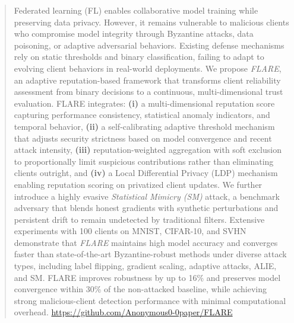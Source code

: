 \documentclass[lettersize,journal]{IEEEtran}
\begin{document}
\begin{abstract}
Federated learning (FL) enables collaborative model training while preserving data privacy. However, it remains vulnerable to malicious clients who compromise model integrity through Byzantine attacks, data poisoning, or adaptive adversarial behaviors. Existing defense mechanisms rely on static thresholds and binary classification, failing to adapt to evolving client behaviors in real-world deployments. We propose \textit{FLARE}, an adaptive reputation-based framework that transforms client reliability assessment from binary decisions to a continuous, multi-dimensional trust evaluation. 
FLARE integrates: \textbf{(i)} a multi-dimensional reputation score capturing performance consistency, statistical anomaly indicators, and temporal behavior, \textbf{(ii)} a self-calibrating adaptive threshold mechanism that adjusts security strictness based on model convergence and recent attack intensity, \textbf{(iii)} reputation-weighted aggregation with soft exclusion to proportionally limit suspicious contributions rather than eliminating clients outright, and \textbf{(iv)} a Local Differential Privacy (LDP) mechanism enabling reputation scoring on privatized client updates.
We further introduce a highly evasive \emph{Statistical Mimicry (SM)} attack, a benchmark adversary that blends honest gradients with synthetic perturbations and persistent drift to remain undetected by traditional filters. Extensive experiments with 100 clients on MNIST, CIFAR-10, and SVHN demonstrate that \textit{FLARE} maintains high model accuracy and converges faster than state-of-the-art Byzantine-robust methods under diverse attack types, including label flipping, gradient scaling, adaptive attacks, ALIE, and SM. FLARE improves robustness by up to 16\% and preserves model convergence within 30\% of the non-attacked baseline, while achieving strong malicious-client detection performance with minimal computational overhead.
\url{https://github.com/Anonymous0-0paper/FLARE}
\end{abstract}
\end{document}

